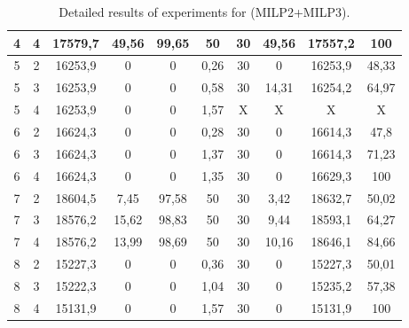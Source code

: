 \begin{table}[!ht]
\begin{tabular}{|c|c|cccc|cccc|}
\rule[-7pt]{0pt}{15pt} 
4	&	4	&	17579,7	&	49,56	&	99,65	&	50	&	30	&	49,56	&	17557,2	&	100	\\
      \hline
\rule[-7pt]{0pt}{15pt} 
5	&	2	&	16253,9	&	0	&	0	&	0,26	&	30	&	0	&	16253,9	&	48,33	\\
\rule[-7pt]{0pt}{15pt} 
5	&	3	&	16253,9	&	0	&	0	&	0,58	&	30	&	14,31	&	16254,2	&	64,97	\\
\rule[-7pt]{0pt}{15pt} 
5	&	4	&	16253,9	&	0	&	0	&	1,57	&	X	&	X	&	X	&	X	\\
      \hline
\rule[-7pt]{0pt}{15pt} 
6	&	2	&	16624,3	&	0	&	0	&	0,28	&	30	&	0	&	16614,3	&	47,8	\\
\rule[-7pt]{0pt}{15pt} 
6	&	3	&	16624,3	&	0	&	0	&	1,37	&	30	&	0	&	16614,3	&	71,23	\\
\rule[-7pt]{0pt}{15pt} 
6	&	4	&	16624,3	&	0	&	0	&	1,35	&	30	&	0	&	16629,3	&	100	\\
      \hline
\rule[-7pt]{0pt}{15pt} 
7	&	2	&	18604,5	&	7,45	&	97,58	&	50	&	30	&	3,42	&	18632,7	&	50,02	\\
\rule[-7pt]{0pt}{15pt} 
7	&	3	&	18576,2	&	15,62	&	98,83	&	50	&	30	&	9,44	&	18593,1	&	64,27	\\
\rule[-7pt]{0pt}{15pt} 
7	&	4	&	18576,2	&	13,99	&	98,69	&	50	&	30	&	10,16	&	18646,1	&	84,66	\\
      \hline
\rule[-7pt]{0pt}{15pt} 
8	&	2	&	15227,3	&	0	&	0	&	0,36	&	30	&	0	&	15227,3	&	50,01	\\
\rule[-7pt]{0pt}{15pt} 
8	&	3	&	15222,3	&	0	&	0	&	1,04	&	30	&	0	&	15235,2	&	57,38	\\
\rule[-7pt]{0pt}{15pt} 
8	&	4	&	15131,9	&	0	&	0
                         &	1,57	&	30	&	0
                                                  &	15131,9	&
                                                                  100
      \\
\hline
    \end{tabular}
\centering
~

  \caption{Detailed results of experiments for (MILP2+MILP3).}
  \label{table3}
\end{table}

